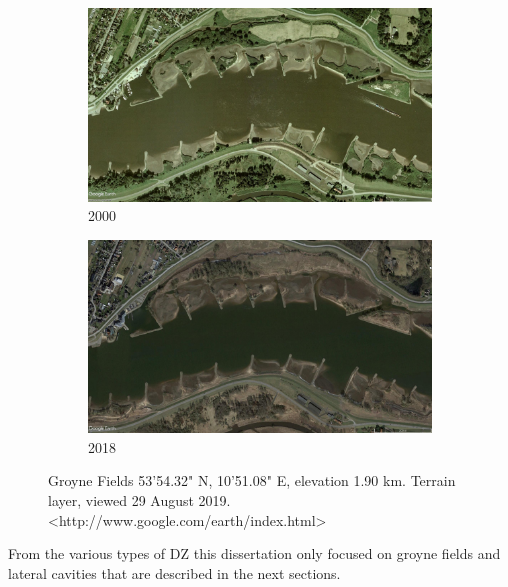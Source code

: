 \begin{figure}[!ht]
\centering
\begin{subfigure}{0.49\textwidth}
  \centering
  \includegraphics[width=0.9\linewidth]{../images/introduction/sat2000.jpg}
  \caption{2000}
  \label{fig:sat2000}
\end{subfigure}%
\begin{subfigure}{.49\textwidth}
  \centering
  \includegraphics[width=0.9\linewidth]{../images/introduction/sat2018.jpg}
  \caption{2018}
  \label{fig:sat2018}
\end{subfigure}
\caption{Groyne Fields 53'54.32" N,  10'51.08" E, elevation 1.90 km. Terrain layer, viewed 29 August 2019. <http://www.google.com/earth/index.html>}
\label{fig:satelliteImage}
\end{figure}

From the various types of DZ this dissertation only focused on groyne fields and lateral cavities that are described in the next sections.
